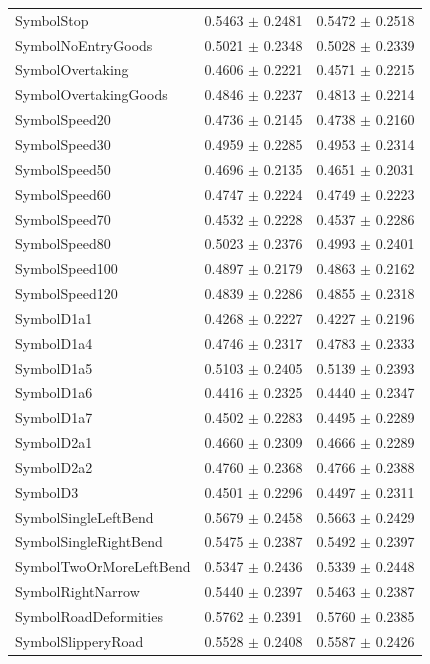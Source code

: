 \begin{longtable}{@{}lrr@{}}
SymbolStop & 0.5463 $\pm$ 0.2481 & 0.5472 $\pm$ 0.2518 \\
SymbolNoEntryGoods & 0.5021 $\pm$ 0.2348 & 0.5028 $\pm$ 0.2339 \\
SymbolOvertaking & 0.4606 $\pm$ 0.2221 & 0.4571 $\pm$ 0.2215 \\
SymbolOvertakingGoods & 0.4846 $\pm$ 0.2237 & 0.4813 $\pm$ 0.2214 \\
SymbolSpeed20 & 0.4736 $\pm$ 0.2145 & 0.4738 $\pm$ 0.2160 \\
SymbolSpeed30 & 0.4959 $\pm$ 0.2285 & 0.4953 $\pm$ 0.2314 \\
SymbolSpeed50 & 0.4696 $\pm$ 0.2135 & 0.4651 $\pm$ 0.2031 \\
SymbolSpeed60 & 0.4747 $\pm$ 0.2224 & 0.4749 $\pm$ 0.2223 \\
SymbolSpeed70 & 0.4532 $\pm$ 0.2228 & 0.4537 $\pm$ 0.2286 \\
SymbolSpeed80 & 0.5023 $\pm$ 0.2376 & 0.4993 $\pm$ 0.2401 \\
SymbolSpeed100 & 0.4897 $\pm$ 0.2179 & 0.4863 $\pm$ 0.2162 \\
SymbolSpeed120 & 0.4839 $\pm$ 0.2286 & 0.4855 $\pm$ 0.2318 \\
SymbolD1a1 & 0.4268 $\pm$ 0.2227 & 0.4227 $\pm$ 0.2196 \\
SymbolD1a4 & 0.4746 $\pm$ 0.2317 & 0.4783 $\pm$ 0.2333 \\
SymbolD1a5 & 0.5103 $\pm$ 0.2405 & 0.5139 $\pm$ 0.2393 \\
SymbolD1a6 & 0.4416 $\pm$ 0.2325 & 0.4440 $\pm$ 0.2347 \\
SymbolD1a7 & 0.4502 $\pm$ 0.2283 & 0.4495 $\pm$ 0.2289 \\
SymbolD2a1 & 0.4660 $\pm$ 0.2309 & 0.4666 $\pm$ 0.2289 \\
SymbolD2a2 & 0.4760 $\pm$ 0.2368 & 0.4766 $\pm$ 0.2388 \\
SymbolD3 & 0.4501 $\pm$ 0.2296 & 0.4497 $\pm$ 0.2311 \\
SymbolSingleLeftBend & 0.5679 $\pm$ 0.2458 & 0.5663 $\pm$ 0.2429 \\
SymbolSingleRightBend & 0.5475 $\pm$ 0.2387 & 0.5492 $\pm$ 0.2397 \\
SymbolTwoOrMoreLeftBend & 0.5347 $\pm$ 0.2436 & 0.5339 $\pm$ 0.2448 \\
SymbolRightNarrow & 0.5440 $\pm$ 0.2397 & 0.5463 $\pm$ 0.2387 \\
SymbolRoadDeformities & 0.5762 $\pm$ 0.2391 & 0.5760 $\pm$ 0.2385 \\
SymbolSlipperyRoad & 0.5528 $\pm$ 0.2408 & 0.5587 $\pm$ 0.2426 \\

\end{longtable}

